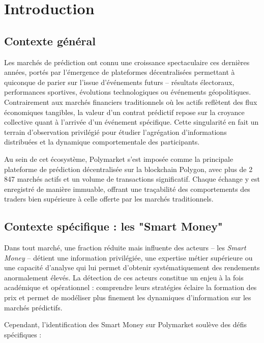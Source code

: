\chapter{Introduction}
\label{chap:introduction}

\section{Contexte général}

Les marchés de prédiction ont connu une croissance spectaculaire ces dernières années, portés par l'émergence de plateformes décentralisées permettant à quiconque de parier sur l'issue d'événements futurs -- résultats électoraux, performances sportives, évolutions technologiques ou événements géopolitiques. Contrairement aux marchés financiers traditionnels où les actifs reflètent des flux économiques tangibles, la valeur d'un contrat prédictif repose sur la croyance collective quant à l'arrivée d'un événement spécifique. Cette singularité en fait un terrain d'observation privilégié pour étudier l'agrégation d'informations distribuées et la dynamique comportementale des participants.

Au sein de cet écosystème, Polymarket s'est imposée comme la principale plateforme de prédiction décentralisée sur la blockchain Polygon, avec plus de 2 847 marchés actifs et un volume de transactions significatif. Chaque échange y est enregistré de manière immuable, offrant une traçabilité des comportements des traders bien supérieure à celle offerte par les marchés traditionnels.

\section{Contexte spécifique : les "Smart Money"}

Dans tout marché, une fraction réduite mais influente des acteurs -- les \textit{Smart Money} -- détient une information privilégiée, une expertise métier supérieure ou une capacité d'analyse qui lui permet d'obtenir systématiquement des rendements anormalement élevés. La détection de ces acteurs constitue un enjeu à la fois académique et opérationnel : comprendre leurs stratégies éclaire la formation des prix et permet de modéliser plus finement les dynamiques d'information sur les marchés prédictifs.

Cependant, l'identification des Smart Money sur Polymarket soulève des défis spécifiques :

